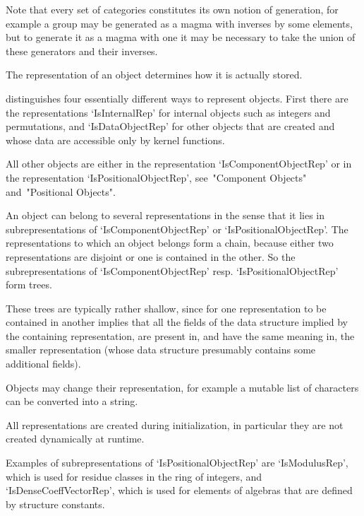 Note that every set of categories constitutes its own notion of
generation, for example a group may be generated as a magma with inverses
by some elements,
but to generate it as a magma with one it may be necessary to take the
union of these generators and their inverses.


The representation of an object determines how it is actually stored.

{\GAP} distinguishes four essentially different ways to represent
objects.
First there are the representations `IsInternalRep' for internal objects
such as integers and permutations,
and `IsDataObjectRep' for other objects that are created and whose data
are accessible only by kernel functions.


All other objects are either in the representation `IsComponentObjectRep'
or in the representation `IsPositionalObjectRep',
see~"Component Objects" and~"Positional Objects".

An object can belong to several representations in the sense that it lies
in subrepresentations of `IsComponentObjectRep' or
`IsPositionalObjectRep'.
The representations to which an object belongs form a chain, 
because either two representations are disjoint or one is contained in
the other.
So the subrepresentations of `IsComponentObjectRep' resp.
`IsPositionalObjectRep' form trees.

These trees are  typically rather shallow, since  for one representation  to be
contained in another implies that all the fields of  the data structure implied
by the containing representation, are present in, and have the same meaning in,
the smaller   representation (whose  data  structure  presumably  contains some
additional fields).

Objects may change their representation,
for example a mutable list of characters can be converted into a string.

All representations are created during initialization,
in particular they are not created dynamically at runtime.

Examples of subrepresentations of `IsPositionalObjectRep' are
`IsModulusRep',
which is used for residue classes in the ring of integers,
and `IsDenseCoeffVectorRep',
which is used for elements of algebras that are defined by structure
constants.

